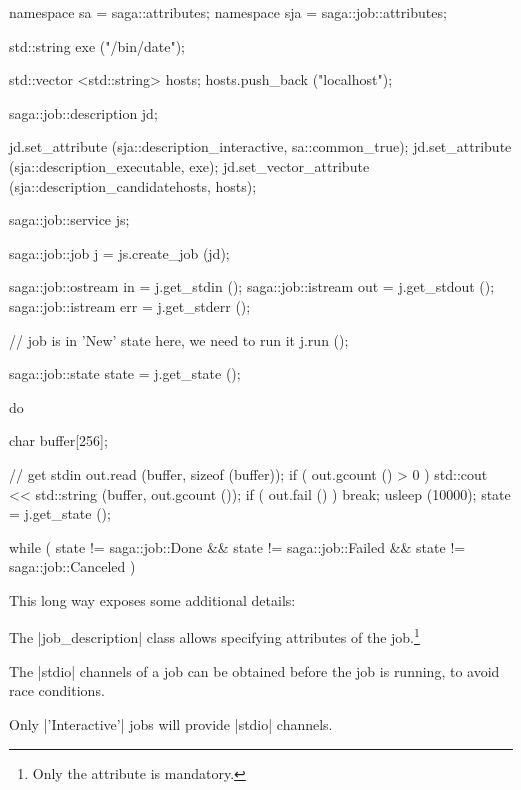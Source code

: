  \begin{mycode}[label=run\_job() expanded]
  namespace sa  = saga::attributes;
  namespace sja = saga::job::attributes;

  std::string exe ("/bin/date");

  std::vector <std::string> hosts;
  hosts.push_back ("localhost");

  saga::job::description jd;

  jd.set_attribute        (sja::description_interactive, sa::common_true);
  jd.set_attribute        (sja::description_executable, exe);
  jd.set_vector_attribute (sja::description_candidatehosts, hosts);

  saga::job::service js;

  saga::job::job j = js.create_job (jd);
  

  saga::job::ostream in  = j.get_stdin  ();
  saga::job::istream out = j.get_stdout ();
  saga::job::istream err = j.get_stderr ();
  
  // job is in 'New' state here, we need to run it
  j.run ();
  
  saga::job::state state = j.get_state ();

  do 
  {
    char buffer[256];

    // get stdin
    out.read (buffer, sizeof (buffer));
    if ( out.gcount () > 0 )
    {
      std::cout << std::string (buffer, out.gcount ());
    }
    if ( out.fail () )
    {
      break;
    }
    usleep (10000);
    state = j.get_state ();

  } while ( state != saga::job::Done &&
            state != saga::job::Failed &&
            state != saga::job::Canceled )
  \end{mycode}

  This long way exposes some additional details:

  \begin{shortlist}

   \item The |job_description| class allows specifying attributes of the
   job.\footnote{Only the  attribute is mandatory.}

   \item The |stdio| channels of a job can be obtained before the job
   is running, to avoid race conditions.

   \item Only |'Interactive'| jobs will provide |stdio| channels.

  \end{shortlist}


